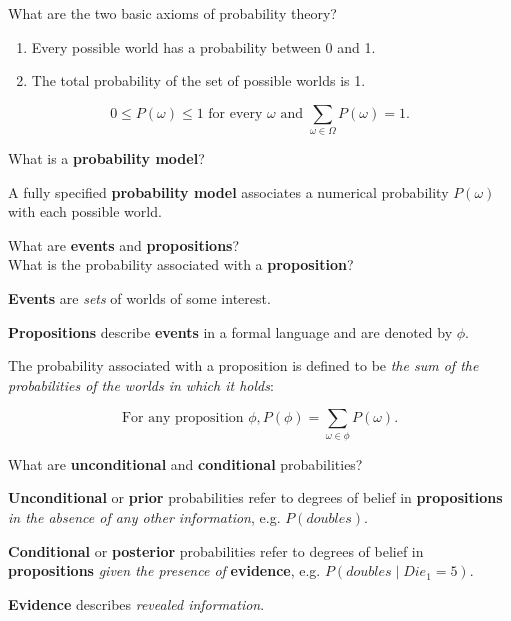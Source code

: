 \begin{flashcard}[Question]{What are the two basic axioms of probability theory?}

\begin{enumerate}[label=\arabic*]
\item Every possible world has a probability between 0 and 1.
\item The total probability of the set of possible worlds is 1.
\end{enumerate}

\begin{displaymath}
0 \leq P(\omega) \leq 1 \text{~for every~} \omega \text{~and~} \sum_{\omega \in \Omega} P(\omega) = 1.
\end{displaymath}

\end{flashcard}

\begin{flashcard}[Question]{What is a \textbf{probability model}?}

A fully specified \textbf{probability model} associates a numerical probability $P(\omega)$ with each possible world.

\end{flashcard}

\begin{flashcard}[Question]{What are \textbf{events} and \textbf{propositions}? \\ What is the probability associated with a \textbf{proposition}?}

\textbf{Events} are \textit{sets} of worlds of some interest.

\medskip

\textbf{Propositions} describe \textbf{events} in a formal language and are denoted by $\phi$.

\smallskip

The probability associated with a proposition is defined to be \textit{the sum of the probabilities of the worlds in which it holds}:

\begin{displaymath}
\text{For any proposition~} \phi, P(\phi) = \sum_{\omega \in \phi} P(\omega).
\end{displaymath}

\end{flashcard}

\begin{flashcard}[Question]{What are \textbf{unconditional} and \textbf{conditional} probabilities?}

\textbf{Unconditional} or \textbf{prior} probabilities refer to degrees of belief in \textbf{propositions} \textit{in the absence of any other information}, e.g. $P(\textit{doubles})$.

\medskip

\textbf{Conditional} or \textbf{posterior} probabilities refer to degrees of belief in \textbf{propositions} \textit{given the presence of} \textbf{evidence}, e.g. $P(\textit{doubles} \mid \textit{Die}_1 = 5)$.

\medskip

\textbf{Evidence} describes \textit{revealed information}.

\end{flashcard}


